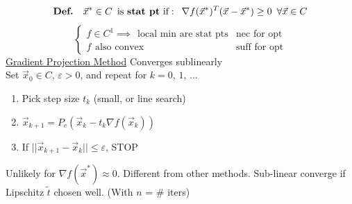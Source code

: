 \documentclass[twocolumn,12pt]{article}    %
\newcommand\Def{\text{\textbf{Def.}} \hspace{5pt}}
\newcommand \hfive {\hspace{5pt}}
\begin{document}
\begin{equation*}
    \Def \hfive \vec{x}^* \in C \hfive \text{is \textbf{stat pt} if}: \hfive \nabla f(\vec{x}^*)^T(\vec{x}-\vec{x}^*) \geq 0 \hfive \forall \vec{x}\in C 
\end{equation*}
\begin{equation*}
    \begin{cases}
        f\in C^1 \implies \hfive \text{local min are stat pts}  & \text{nec for opt}\\
        f \hfive \text{also convex}  & \text{suff for opt}
    \end{cases}
\end{equation*}
\noindent\underline{Gradient Projection Method} \hspace{30pt} Converges sublinearly\\
Set \(\vec{x}_0 \in C \), \(\varepsilon>0\), and repeat for \(k= 0,\,1,\, \dots\)
\begin{enumerate}
    \item Pick step size \(t_k\) (small, or line search)
    \item \(\vec{x}_{k+1} = P_c(\vec{x}_k - t_k\nabla f(\vec{x}_k) )\)
    \item If \(||\vec{x}_{k+1} -\vec{x}_k || \leq \varepsilon\), STOP
\end{enumerate}
Unlikely for \(\nabla f(\vec{x}^*) \approx 0\). Different from other methods. Sub-linear converge if Lipschitz \(\tilde{t}\) chosen well. (With \(n\) = \# iters)
\end{document}
